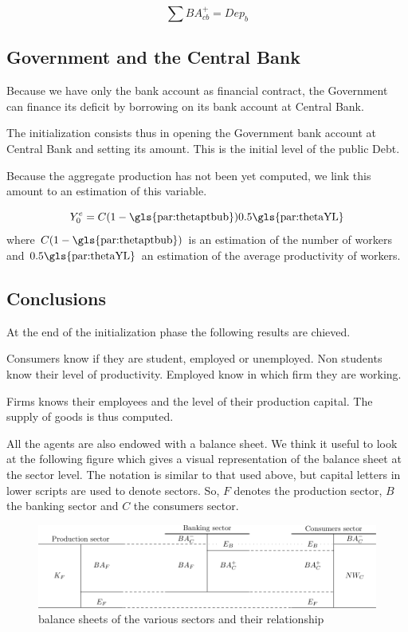 \documentclass{book}
\begin{document}
\[
	\sum BA^{+}_{cb}=Dep_b
\]
\subsection{Government and the Central Bank}
Because we have only the bank account as financial contract, the Government can finance its deficit by borrowing on its bank account at Central Bank. 

The initialization consists thus in opening the Government bank account at Central Bank and setting its amount. This is the initial level of the public Debt.

Because the aggregate production has not been yet computed, we link this amount to an estimation of this variable.

\[
	Y^e_0=C(1-\textnormal{\gls{par:thetaptbub}})0.5\textnormal{\gls{par:thetaYL}}
\]
where $C(1-\textnormal{\gls{par:thetaptbub}})$ is an estimation of the number of workers and $0.5\textnormal{\gls{par:thetaYL}}$ an estimation of the average productivity of workers.


\subsection{Conclusions}

At the end of the initialization phase the following results are chieved.

Consumers know if they are student, employed or unemployed. Non students know their level of productivity. Employed know in which firm they are working.

Firms knows their employees and the level of their production capital. The supply of goods is thus computed.

All the agents are also endowed with a balance sheet. We think it useful to look at the following figure which gives a visual representation of the balance sheet at the sector level. 
The notation is similar to that used above, but capital letters in lower scripts are used to denote sectors. So, $F$ denotes the production sector, $B$ the banking sector and $C$ the consumers sector. 

\begin{figure}[htp]
	\centering
\includegraphics[scale=0.7]{manual_balances-0.pdf}
	\caption{balance sheets of the various sectors and their relationship}
	\label{fig:balances}
\end{figure}
\end{document}
